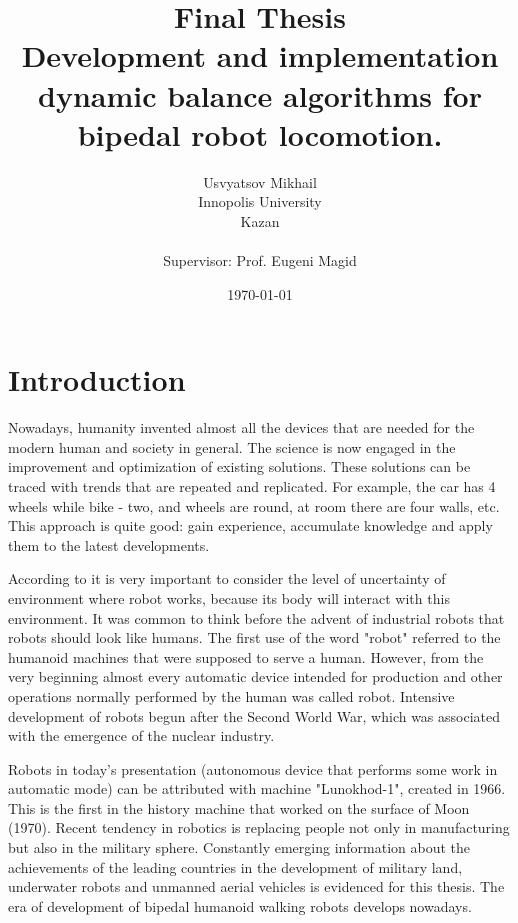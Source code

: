 \documentclass[11pt,a4paper]{report}
\begin{document}
	
\title{Final Thesis\\ Development and implementation dynamic balance algorithms for bipedal robot locomotion.}
\author{Usvyatsov Mikhail\\Innopolis University\\Kazan\\  ~\\ \normalsize Supervisor: Prof. Eugeni Magid}
\date{\normalsize \today}
\maketitle

\tableofcontents

\newpage

\chapter{Introduction}
Nowadays, humanity invented almost all the devices that are needed for the modern human and society in general. The science is now engaged in the improvement and optimization of existing solutions. These solutions can be traced with trends that are repeated and replicated. For example, the car has 4 wheels while bike - two, and wheels are round, at room there are four walls, etc. This approach is quite good: gain experience, accumulate knowledge and apply them to the latest developments.

According to \cite{pfeifer2007self} it is very important to consider the level of uncertainty of environment where robot works, because its body will interact with this environment. It was common to think before the advent of industrial robots that robots should look like humans. The first use of the word "robot" referred to the humanoid machines that were supposed to serve a human. However, from the very beginning almost every automatic device intended for production and other operations normally performed by the human was called robot. Intensive development of robots begun after the Second World War, which was associated with the emergence of the nuclear industry.

Robots in today's presentation (autonomous device that performs some work in automatic mode) can be attributed with machine "Lunokhod-1", created in 1966. This is the first in the history machine that worked on the surface of Moon (1970). Recent tendency in robotics is replacing people not only in manufacturing but also in the military sphere. Constantly emerging information about the achievements of the leading countries in the development of military land, underwater robots and unmanned aerial vehicles is evidenced for this thesis. The era of development of  bipedal humanoid walking robots develops nowadays.
\end{document}
